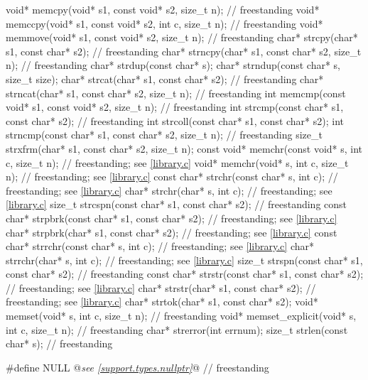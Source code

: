 \begin{codeblock}
{  void* memcpy(void* s1, const void* s2, size_t n);                     // freestanding
  void* memccpy(void* s1, const void* s2, int c, size_t n);             // freestanding
  void* memmove(void* s1, const void* s2, size_t n);                    // freestanding
  char* strcpy(char* s1, const char* s2);                               // freestanding
  char* strncpy(char* s1, const char* s2, size_t n);                    // freestanding
  char* strdup(const char* s);
  char* strndup(const char* s, size_t size);
  char* strcat(char* s1, const char* s2);                               // freestanding
  char* strncat(char* s1, const char* s2, size_t n);                    // freestanding
  int memcmp(const void* s1, const void* s2, size_t n);                 // freestanding
  int strcmp(const char* s1, const char* s2);                           // freestanding
  int strcoll(const char* s1, const char* s2);
  int strncmp(const char* s1, const char* s2, size_t n);                // freestanding
  size_t strxfrm(char* s1, const char* s2, size_t n);
  const void* memchr(const void* s, int c, size_t n);                   // freestanding; see \ref{library.c}
  void* memchr(void* s, int c, size_t n);                               // freestanding; see \ref{library.c}
  const char* strchr(const char* s, int c);                             // freestanding; see \ref{library.c}
  char* strchr(char* s, int c);                                         // freestanding; see \ref{library.c}
  size_t strcspn(const char* s1, const char* s2);                       // freestanding
  const char* strpbrk(const char* s1, const char* s2);                  // freestanding; see \ref{library.c}
  char* strpbrk(char* s1, const char* s2);                              // freestanding; see \ref{library.c}
  const char* strrchr(const char* s, int c);                            // freestanding; see \ref{library.c}
  char* strrchr(char* s, int c);                                        // freestanding; see \ref{library.c}
  size_t strspn(const char* s1, const char* s2);                        // freestanding
  const char* strstr(const char* s1, const char* s2);                   // freestanding; see \ref{library.c}
  char* strstr(char* s1, const char* s2);                               // freestanding; see \ref{library.c}
  char* strtok(char* s1, const char* s2);
  void* memset(void* s, int c, size_t n);                               // freestanding
  void* memset_explicit(void* s, int c, size_t n);                      // freestanding
  char* strerror(int errnum);
  size_t strlen(const char* s);                                         // freestanding
}

#define NULL @\textit{see \ref{support.types.nullptr}}@                                                // freestanding
\end{codeblock}

